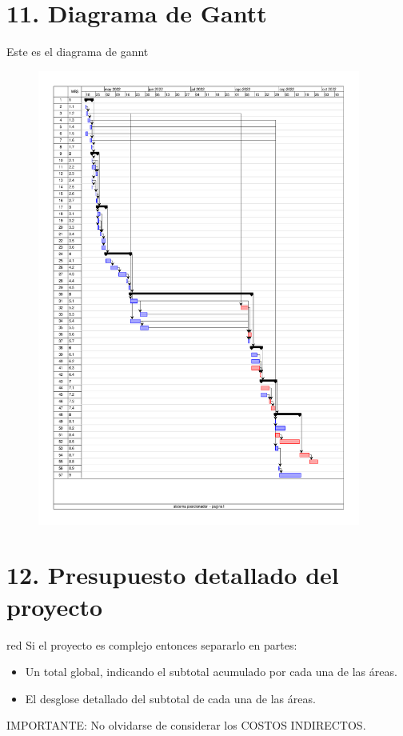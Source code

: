 \documentclass[11pt, %
codirector, %
]{charter}
\begin{document}
\section{11. Diagrama de Gantt}
\label{sec:gantt}
Este es el diagrama de gannt 
\begin{figure}[H]
	\includegraphics[width = \textwidth, height = 15cm,trim={0 3cm 0  0.1cm},clip ]{./Figuras/AonGantt/gannt_poss.pdf}
\end{figure}




\section{12. Presupuesto detallado del proyecto}
\label{sec:presupuesto}

\begin{consigna}{red}
Si el proyecto es complejo entonces separarlo en partes:
\begin{itemize}
	\item Un total global, indicando el subtotal acumulado por cada una de las áreas.
	\item El desglose detallado del subtotal de cada una de las áreas.
\end{itemize}

IMPORTANTE: No olvidarse de considerar los COSTOS INDIRECTOS.

\end{consigna}
\end{document}
